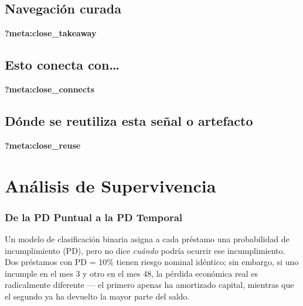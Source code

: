 \documentclass[
  spanish,
  11pt,
  letterpaper,
]{scrbook}
\theoremstyle{plain}
\theoremstyle{remark}
\begin{document}
\section{Navegación curada}\label{navegaciuxf3n-curada-2}

\begin{tcolorbox}[enhanced jigsaw, arc=.35mm, bottomrule=.15mm, bottomtitle=1mm, breakable, colback=white, colbacktitle=quarto-callout-tip-color!10!white, colframe=quarto-callout-tip-color-frame, coltitle=black, left=2mm, leftrule=.75mm, opacityback=0, opacitybacktitle=0.6, rightrule=.15mm, title=\textcolor{quarto-callout-tip-color}{\faLightbulb}\hspace{0.5em}{Qué debes quedarte}, titlerule=0mm, toprule=.15mm, toptitle=1mm]

\textbf{?meta:close\_takeaway}

\section{Esto conecta con\ldots{}}\label{esto-conecta-con-6}

\textbf{?meta:close\_connects}

\section{Dónde se reutiliza esta señal o
artefacto}\label{duxf3nde-se-reutiliza-esta-seuxf1al-o-artefacto-6}

\textbf{?meta:close\_reuse}

\end{tcolorbox}

\chapter{Análisis de Supervivencia}\label{sec-survival}

\subsection{De la PD Puntual a la PD
Temporal}\label{de-la-pd-puntual-a-la-pd-temporal}

Un modelo de clasificación binaria asigna a cada préstamo una
probabilidad de incumplimiento (PD), pero no dice \emph{cuándo} podría
ocurrir ese incumplimiento. Dos préstamos con PD = 10\% tienen riesgo
nominal idéntico; sin embargo, si uno incumple en el mes 3 y otro en el
mes 48, la pérdida económica real es radicalmente diferente --- el
primero apenas ha amortizado capital, mientras que el segundo ya ha
devuelto la mayor parte del saldo.
\end{document}
